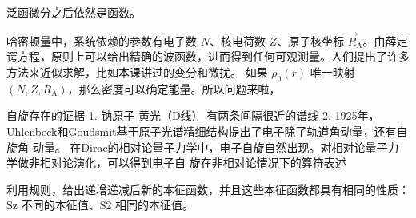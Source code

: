 泛函微分之后依然是函数。


哈密顿量中，系统依赖的参数有电子数 $N$、核电荷数 $Z$、原子核坐标 $\vec R_{\text{A}}$。由薛定谔方程，原则上可以给出精确的波函数，进而得到任何可观测量。人们提出了许多方法来近似求解，比如本课讲过的变分和微扰。
如果 $\rho_0(r)$ 唯一映射 $(N, Z, R_{\text{A}})$，那么密度可以确定能量。所以问题来啦，

自旋存在的证据
1. 钠原子 黄光（D线）
有两条间隔很近的谱线
2. 1925年，Uhlenbeck和Goudsmit基于原子光谱精细结构提出了电子除了轨道角动量，还有自旋角
动量。
在Dirac的相对论量子力学中，电子自旋自然出现。对相对论量子力学做非相对论演化，可以得到电子自
旋在非相对论情况下的算符表述


利用规则，给出递增递减后新的本征函数，并且这些本征函数都具有相同的性质：Sz 不同的本征值、S2 相同的本征值。

